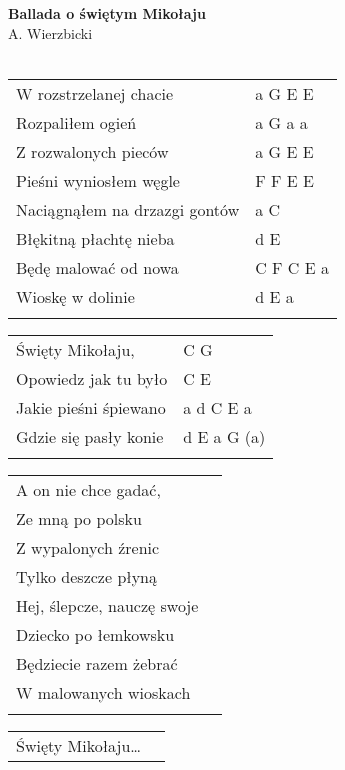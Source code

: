 \documentclass[a5paper]{article}
\begin{document}


\noindent
\fontsize{12pt}{15pt}\selectfont
\textbf{Ballada o świętym Mikołaju} \\
\fontsize{8pt}{10pt}\selectfont
A. Wierzbicki \\ \\
\fontsize{10pt}{12pt}\selectfont
{}
\begin{tabular}{@{}p{8cm}p{3cm}@{}}
\noindent
W rozstrzelanej chacie & a G E E \\
Rozpaliłem ogień & a G a a \\
Z rozwalonych pieców & a G E E \\
Pieśni wyniosłem węgle & F F E E \\
Naciągnąłem na drzazgi gontów & a C \\
Błękitną płachtę nieba & d E \\
Będę malować od nowa & C F C E a \\
Wioskę w dolinie & d E a \\ \\
\end{tabular}

\noindent
\begin{tabular}{@{}p{7cm}p{3cm}@{}}
Święty Mikołaju, & C G \\
Opowiedz jak tu było & C E \\
Jakie pieśni śpiewano & a d C E a \\
Gdzie się pasły konie & d E a G (a) \\ \\
\end{tabular}

\noindent
\begin{tabular}{@{}p{8.5cm}p{3cm}@{}}
A on nie chce gadać, \\
Ze mną po polsku \\
Z wypalonych źrenic \\
Tylko deszcze płyną \\
Hej, ślepcze, nauczę swoje \\
Dziecko po łemkowsku \\
Będziecie razem żebrać \\
W malowanych wioskach \\ \\
\end{tabular}

\noindent
\begin{tabular}{@{}p{8.5cm}p{3cm}@{}} 
Święty Mikołaju… \\
\end{tabular}
\end{document}
